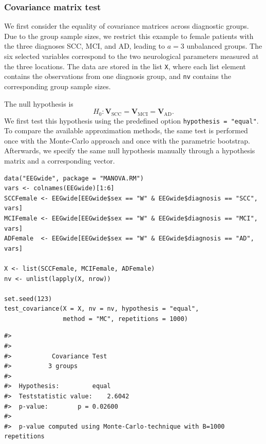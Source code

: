 \subsubsection{Covariance matrix test}\label{covariance-matrix-test}

We first consider the equality of covariance matrices across diagnostic groups.
Due to the group sample sizes, we restrict this example to female patients with
the three diagnoses SCC, MCI, and AD, leading to \(a = 3\) unbalanced groups.
The six selected variables correspond to the two neurological parameters
measured at the three locations. The data are stored in the list \texttt{X}, where
each list element contains the observations from one diagnosis group, and \texttt{nv}
contains the corresponding group sample sizes.

The null hypothesis is
\begin{equation}
H_0:\boldsymbol{V}_{\mathrm{SCC}}
=\boldsymbol{V}_{\mathrm{MCI}}
=\boldsymbol{V}_{\mathrm{AD}}.
\label{eq:eeg-cov-hypothesis}
\end{equation}
We first test this hypothesis using the predefined option
\texttt{hypothesis\ =\ "equal"}. To compare the available approximation methods, the
same test is performed once with the Monte-Carlo approach and once with the
parametric bootstrap. Afterwards, we specify the same null hypothesis manually
through a hypothesis matrix and a corresponding vector.

\begin{verbatim}
data("EEGwide", package = "MANOVA.RM")
vars <- colnames(EEGwide)[1:6]
SCCFemale <- EEGwide[EEGwide$sex == "W" & EEGwide$diagnosis == "SCC", vars]
MCIFemale <- EEGwide[EEGwide$sex == "W" & EEGwide$diagnosis == "MCI", vars]
ADFemale  <- EEGwide[EEGwide$sex == "W" & EEGwide$diagnosis == "AD", vars]

X <- list(SCCFemale, MCIFemale, ADFemale)
nv <- unlist(lapply(X, nrow))

set.seed(123)
test_covariance(X = X, nv = nv, hypothesis = "equal",
                method = "MC", repetitions = 1000)
\end{verbatim}

\begin{verbatim}
#> 
#> 
#>           Covariance Test 
#>          3 groups
#> 
#>  Hypothesis:         equal
#>  Teststatistic value:    2.6042
#>  p-value:        p = 0.02600
#>  
#>  p-value computed using Monte-Carlo-technique with B=1000 repetitions
\end{verbatim}


